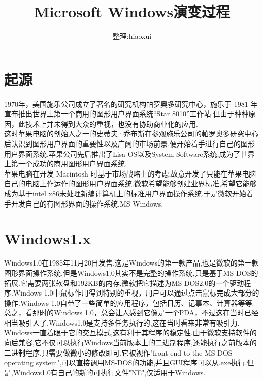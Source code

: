 \documentclass[a4paper,12pt,notitlepage]{article}
\begin{document}
\title{Microsoft Windows演变过程}
\author{整理:hiaoxui}
\maketitle

\section{起源}

	1970年，美国施乐公司成立了著名的研究机构帕罗奥多研究中心，施乐于 1981 年宣布推出世界上第一个商用的图形用户界面系统“Star 8010”工作站.但由于种种原因，此技术上并未得到大众的重视，也没有协助商业化的应用. \\
	
	这时苹果电脑的创始人之一的史蒂夫·乔布斯在参观施乐公司的帕罗奥多研究中心后认识到图形用户界面的重要性以及广阔的市场前景,便开始着手进行自己的图形用户界面系统.苹果公司先后推出了Lisa OS以及System Software系统,成为了世界上第一个成功的商用图形用户界面系统. \\
	
	苹果电脑在开发 Macintosh 时基于市场战略上的考虑,故意开发了只能在苹果电脑自己的电脑上作运作的图形用户界面系统.微软希望能够创建业界标准,希望它能够成为基于intel x86未处理新编计算机上的标准用户界面操作系统.于是微软开始着手开发自己的有图形界面的操作系统,MS Windows. \\

\section{Windows1.x}

	Windows1.0在1985年11月20日发售,这是Windows的第一款产品,也是微软的第一款图形界面操作系统.但是Windows1.0其实不是完整的操作系统,只是基于MS-DOS的拓展.它需要两张软盘和192KB的内存,微软把它描述为MS-DOS2.0的一个驱动程序.Windows 1.0中鼠标作用得到特别的重视，用户可以通过点击鼠标完成大部分的操作.Windows 1.0自带了一些简单的应用程序，包括日历、记事本、计算器等等.总之，看那时的Windows 1.0，总会让人感到它像是一个PDA，不过这在当时已经相当吸引人了.Windows1.0是支持多任务执行的,这在当时看来非常有吸引力. \\
	
	Windows一直着眼于它的交互模式,这有利于其程序的稳定性.由于微软支持软件的向后兼容,它不仅可以执行Windows当前版本上的二进制程序,还能执行之前版本的二进制程序,只需要做微小的修改即可.它被视作"front-end to the MS-DOS operating system",可以直接调用MS-DOS的功能,并且GUI程序可以从.exe执行.但是,Windows1.0有自己的新的可执行文件"NE",仅适用于Windows. \\
	
\end{document}
